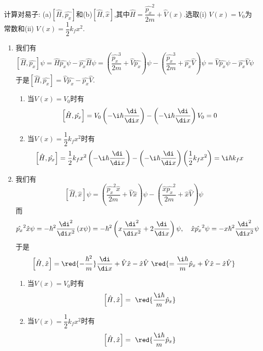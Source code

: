 \documentclass{ctexart}
\begin{document}
\begin{homework}[13.]
    计算对易子: (a)$\left[\hat{H},\hat{p_x}\right]$和(b)$\left[\hat{H},\hat{x}\right]$,其中$\hat{H}=\dfrac{\hat{p_x}^2}{2m}+\hat{V}(x)$.选取(i) $V(x)=V_0$为常数和(ii) $V(x)=\dfrac12k_fx^2$.
\end{homework}
\begin{solution}
\begin{enumerate}[label=(\alph*)]
    \item 我们有
        \[\left[\hat{H},\hat{p_x}\right]\psi=\hat{H}\hat{p_x}\psi-\hat{p_x}\hat{H}\psi=\left(\dfrac{\hat{p_x}^3}{2m}+\hat{V}\hat{p_x}\right)\psi-\left(\dfrac{\hat{p_x}^3}{2m}+\hat{p_x}\hat{V}\right)\psi=\hat{V}\hat{p_x}\psi-\hat{p_x}\hat{V}\psi\]
        于是$\left[\hat{H},\hat{p_x}\right]=\hat{V}\hat{p_x}-\hat{p_x}\hat{V}$.
        \begin{enumerate}[label=(\roman*)]
            \item 当$V(x)=V_0$时有
            \[\left[\hat{H},\hat{p_x}\right]=V_0\left(-\i\hbar\dfrac{\di}{\di x}\right)-\left(-\i\hbar\dfrac{\di}{\di x}\right)V_0=0\]
            \item 当$V(x)=\dfrac12k_fx^2$时有
            \[\left[\hat{H},\hat{p_x}\right]=\dfrac12k_fx^2\left(-\i\hbar\dfrac{\di}{\di x}\right)-\left(-\i\hbar\dfrac{\di}{\di x}\right)\left(\dfrac12k_fx^2\right)=\i\hbar k_fx\]
        \end{enumerate}
    \item 我们有
        \[\left[\hat{H},\hat{x}\right]\psi=\left(\dfrac{\hat{p_x}^2\hat{x}}{2m}+\hat{V}\hat{x}\right)\psi-\left(\dfrac{\hat{x}\hat{p_x}^2}{2m}+\hat{x}\hat{V}\right)\psi\]
        而
        \[\hat{p_x}^2\hat{x}\psi=-\hbar^2\dfrac{\di^2}{\di x^2}\left(x\psi\right)=-\hbar^2\left(x\dfrac{\di^2}{\di x^2}+2\dfrac{\di}{\di x}\right)\psi,\quad\hat{x}\hat{p_x}^2\psi=-x\hbar^2\dfrac{\di^2}{\di x^2}\psi\]
        于是
        \[\left[\hat{H},\hat{x}\right]=\red{-\dfrac{\hbar^2}{m}}\dfrac{\di}{\di x}+\hat{V}\hat{x}-\hat{x}\hat{V}\ \red{=\dfrac{\i\hbar}{m}\hat{p}_x+\hat{V}\hat{x}-\hat{x}\hat{V}}\]
        \begin{enumerate}[label=(\roman*)]
            \item 当$V(x)=V_0$时有
            \[\left[\hat{H},\hat{x}\right]=\ \red{\dfrac{\i\hbar}{m}\hat{p}_x}\]
            \item 当$V(x)=\dfrac12k_fx^2$时有
            \[\left[\hat{H},\hat{x}\right]=\ \red{\dfrac{\i\hbar}{m}\hat{p}_x}\]
        \end{enumerate}
\end{enumerate}
\end{solution}
\end{document}
